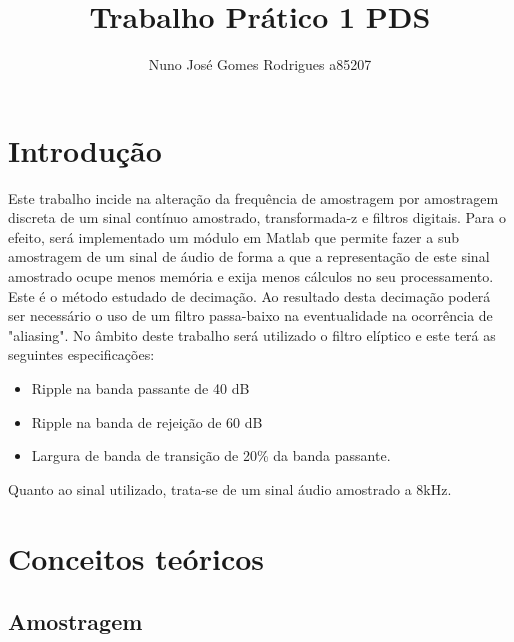 \documentclass[11pt]{article}
\begin{document}
\title{Trabalho Prático 1 PDS}
\author{Nuno José Gomes Rodrigues a85207}
\maketitle

\tableofcontents

\pagebreak
\section{Introdução}

Este trabalho incide na alteração da frequência de amostragem por amostragem discreta de um sinal contínuo amostrado, transformada-z e filtros digitais. Para o efeito, será implementado um módulo em Matlab que permite fazer a sub amostragem de um sinal de áudio de forma a que a representação de este sinal amostrado ocupe menos memória e exija menos cálculos no seu processamento. Este é o método estudado de decimação.
Ao resultado desta decimação poderá ser necessário o uso de um filtro passa-baixo na eventualidade na ocorrência de "aliasing". No âmbito deste trabalho será utilizado o filtro elíptico e este terá as seguintes especificações:
\begin{itemize}
\item{Ripple na banda passante de 40 dB}
\item{Ripple na banda de rejeição de 60 dB}
\item{Largura de banda de transição de 20\% da banda passante.}
\end{itemize}
Quanto ao sinal utilizado, trata-se de um sinal áudio amostrado a 8kHz.
\pagebreak
\section{Conceitos teóricos}
\subsection{Amostragem}
\end{document}
